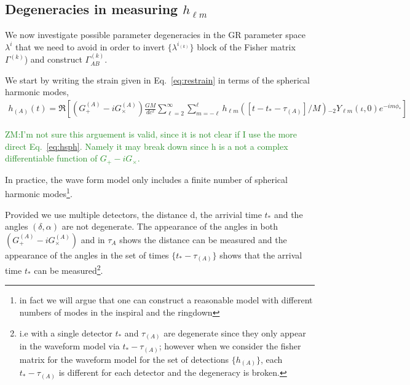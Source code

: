 \documentclass[aps,prd,amsmath,showpacs,amssymb,superscriptaddress,nofootinbib,longbibliography,eqsecnum,preprintnumbers]{revtex4-1}
\newcommand{\Ys}{{}_{-2}Y_{\ell m}}
\newcommand{\zach}[1]{\textcolor{ForestGreen}{#1}}
\begin{document}
\subsection{Degeneracies in measuring $h_{\ell m}$}
We now investigate possible parameter degeneracies in the GR parameter space $\lambda^{i}$ that we need to avoid in order to invert  $\{\lambda^{i_{(k)}}\}$ block of the Fisher matrix $\Gamma^{(k)}$) and construct $\Gamma^{(k)}_{AB}$.

We start by writing the strain given in Eq.~\eqref{eq:restrain} in terms of the spherical harmonic modes,
\begin{align}
h_{(A)}(t)=\Re\left[ (G_+^{(A)}-iG_\times^{(A)})\frac{GM}{dc^2}\sum_{\ell =2}^\infty\sum_{m=-\ell}^{\ell}h_{\ell m}([t-t_*-\tau_{(A)}]/M)\Ys(\iota,0)e^{-im\phi_*}\right]
\end{align}

\zach{ZM:I'm not sure this arguement is valid, since it is not clear if I use the more direct Eq.~\eqref{eq:hsph}. Namely it may break down since h is a not a complex differentiable function of $G_+-iG_\times$.}

In practice, the wave form model only includes a finite number of spherical harmonic modes\footnote{in fact we will argue that one can construct a reasonable model with different numbers of modes in the inspiral and the ringdown}.

Provided we use multiple detectors, the distance d, the arrivial time $t_*$ and the angles $(\delta,\alpha)$ are not degenerate. The appearance of the angles in both $(G_+^{(A)}-iG_\times^{(A)})$ and in $\tau_{A}$ shows the distance can be measured and the appearance of the angles in the set of times $\{t_*-\tau_{(A)}\}$ shows that the arrival time $t_*$ can be measured\footnote{i.e with a single detector $t_*$ and $\tau_{(A)}$ are degenerate since they only appear in the waveform model via $t_*-\tau_{(A)}$; however when we consider the fisher matrix for the waveform model for the set of detections $\{h_{(A)}\}$, each $t_*-\tau_{(A)}$ is different for each detector and the degeneracy is broken.}.
\end{document}
